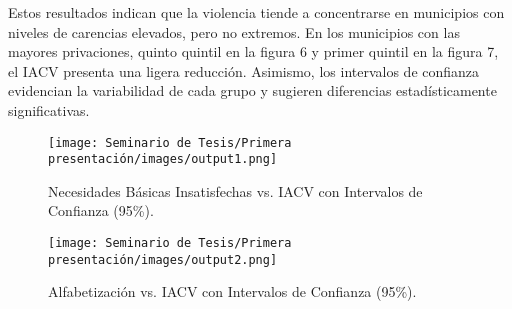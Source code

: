 Estos resultados indican que la violencia tiende a concentrarse en municipios con niveles de carencias elevados, pero no extremos. En los municipios con las mayores privaciones, quinto quintil en la figura 6 y primer quintil en la figura 7, el IACV presenta una ligera reducción. Asimismo, los intervalos de confianza evidencian la variabilidad de cada grupo y sugieren diferencias estadísticamente significativas.
\newpage
\begin{figure}[h!]
    \centering
    \texttt{[image: Seminario de Tesis/Primera presentación/images/output1.png]}
    \caption{Necesidades Básicas Insatisfechas vs. IACV con Intervalos de Confianza (95\%).}
    \label{fig:nbivia1}
\end{figure}
\begin{figure}[h!]
    \centering
    \texttt{[image: Seminario de Tesis/Primera presentación/images/output2.png]}
    \caption{Alfabetización vs. IACV con Intervalos de Confianza (95\%).}
    \label{fig:nbivia2}
\end{figure}

\newpage